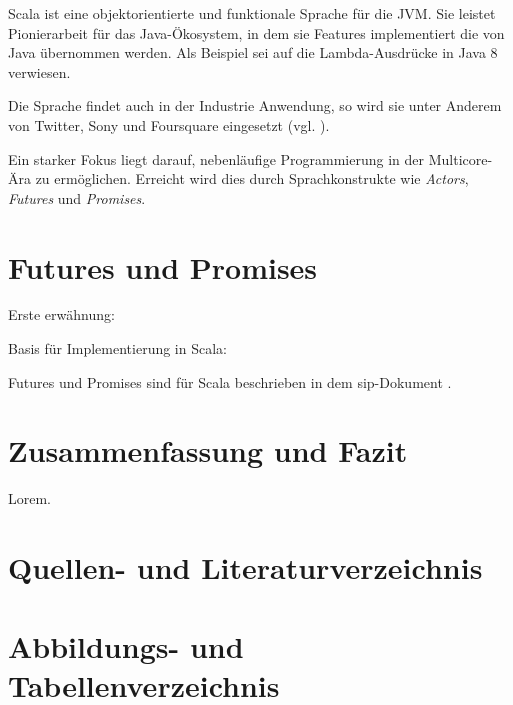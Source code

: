 \documentclass[11pt,a4paper,titlepage,ngerman]{scrartcl}
\begin{document}
Scala ist eine objektorientierte und funktionale Sprache für die JVM. Sie
leistet Pionierarbeit für das Java-Ökosystem, in dem sie Features implementiert
die von Java übernommen werden. Als Beispiel sei auf die Lambda-Ausdrücke in
Java 8 verwiesen.

Die Sprache findet auch in der Industrie Anwendung, so wird sie unter Anderem von Twitter,
Sony und Foursquare eingesetzt (vgl. \cite{scalaInEnterprise}).

Ein starker Fokus liegt darauf, nebenläufige Programmierung in der Multicore-Ära
zu ermöglichen. Erreicht wird dies durch Sprachkonstrukte wie \emph{Actors},
\emph{Futures} und \emph{Promises}.


\section{Futures und Promises}

Erste erwähnung: \cite{Baker:1977:IGC:872734.806932}

Basis für Implementierung in Scala: \cite{Lea:2000:JFF:337449.337465}

Futures und Promises sind für Scala beschrieben in dem \gls{sip}-Dokument 
\cite{sip14}.

\newpage
\section{Zusammenfassung und Fazit}

Lorem. \cite{scalalang}

\newpage

\section{Quellen- und Literaturverzeichnis}




\section{Abbildungs- und Tabellenverzeichnis}

\renewcommand{\listfigurename}{Verzeichnis der Abbildungen}
\listoffigures

\newpage

\printglossary
\end{document}
